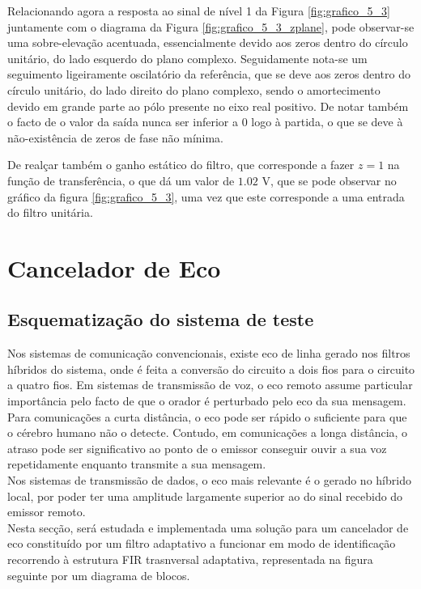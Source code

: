 \documentclass[a4paper,11pt]{report}
\begin{document}
Relacionando agora a resposta ao sinal de nível 1 da Figura \ref{fig:grafico_5_3} juntamente com o diagrama da Figura \ref{fig:grafico_5_3_zplane}, pode observar-se uma sobre-elevação acentuada, essencialmente devido aos zeros dentro do círculo unitário, do lado esquerdo do plano complexo. Seguidamente nota-se um seguimento ligeiramente oscilatório da referência, que se deve aos zeros dentro do círculo unitário, do lado direito do plano complexo, sendo o amortecimento devido em grande parte ao pólo presente no eixo real positivo. De notar também o facto de o valor da saída nunca ser inferior a 0 logo à partida, o que se deve à não-existência de zeros de fase não mínima.

De realçar também o ganho estático do filtro, que corresponde a fazer $z=1$ na função de transferência, o que dá um valor de $1.02$ V, que se pode observar no gráfico da figura \ref{fig:grafico_5_3}, uma vez que este corresponde a uma entrada do filtro unitária.

\chapter{Cancelador de Eco}

\section{Esquematização do sistema de teste}
Nos sistemas de comunicação convencionais, existe eco de linha gerado nos filtros híbridos do sistema, onde é feita a conversão do circuito a dois fios para o circuito a quatro fios. Em sistemas de transmissão de voz, o eco remoto assume particular importância pelo facto de que o orador é perturbado pelo eco da sua mensagem. Para comunicações a curta distância, o eco pode ser rápido o suficiente para que o cérebro humano não o detecte. Contudo, em comunicações a longa distância, o atraso pode ser significativo ao ponto de o emissor conseguir ouvir a sua voz repetidamente enquanto transmite a sua mensagem.\\
Nos sistemas de transmissão de dados, o eco mais relevante é o gerado no híbrido local, por poder ter uma amplitude largamente superior ao do sinal recebido do emissor remoto.\\

Nesta secção, será estudada e implementada uma solução para um cancelador de eco constituído por um filtro adaptativo a funcionar em modo de identificação recorrendo à estrutura FIR trasnversal adaptativa, representada na figura seguinte por um diagrama de blocos.
\end{document}

